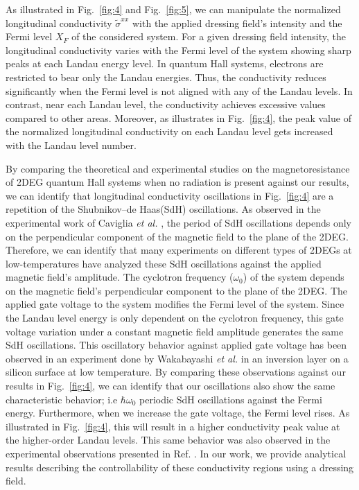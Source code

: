 \documentclass[
 reprint,
 amsmath,amssymb,
 aps,
 prb,
]{revtex4-2}
\begin{document}
As illustrated in Fig.~\ref{fig:4} and Fig.~\ref{fig:5}, we can manipulate the normalized longitudinal conductivity $\widetilde{\sigma}^{xx}$ with the applied dressing field's intensity and the Fermi level $X_F$ of the considered system.
For a given dressing field intensity, the longitudinal conductivity varies with  the Fermi level of the system showing sharp peaks at each Landau energy level.
In quantum Hall systems, electrons are restricted to bear only the Landau energies. Thus, the conductivity reduces significantly when the Fermi level is not aligned with any of the Landau levels. In contrast, near each Landau level, the conductivity achieves excessive values compared to other areas. Moreover, as illustrates in Fig.~\ref{fig:4}, the peak value of the normalized longitudinal conductivity on each Landau level gets increased with the Landau level number.

{\color{Red}
By comparing the theoretical \cite{ando72,ando74_1,ando74_2,ando74_3,ando74_4,ando82,endo09} and experimental \cite{endo09,wakabayashi78,ochiai190,mancoff96,arapov02,grbic04,caviglia10} studies on the magnetoresistance of 2DEG quantum Hall systems when no radiation is present against our results, we can identify that longitudinal conductivity oscillations in Fig.~\ref{fig:4} are a repetition of the Shubnikov–de Haas(SdH) oscillations.
As observed in the experimental work of Caviglia \textit{et al.} \cite{caviglia10}, the period of SdH oscillations depends only on the perpendicular component of the magnetic field to the plane of the 2DEG.
Therefore, we can identify that many experiments on different types of 2DEGs at low-temperatures \cite{endo09,ochiai190,mancoff96,arapov02,grbic04,caviglia10} have analyzed these SdH oscillations against the applied magnetic field's amplitude.
The cyclotron frequency ($\omega_0$) of the system depends on the magnetic field's perpendicular component to the plane of the 2DEG.
The applied gate voltage to the system modifies the Fermi level of the system.
Since the Landau level energy is only dependent on the cyclotron frequency, this gate voltage variation under a constant magnetic field amplitude generates the same SdH oscillations.
This oscillatory behavior against applied gate voltage has been observed in an  experiment done by Wakabayashi \textit{et al.} \cite{wakabayashi78} in an inversion layer on a silicon surface at low temperature.
By comparing these observations against our results in Fig.~\ref{fig:4}, we can identify that our oscillations also show the same characteristic behavior; i.e  $\hbar\omega_0$ periodic SdH oscillations against the Fermi energy.
Furthermore, when we increase the gate voltage, the Fermi level rises. As illustrated in Fig.~\ref{fig:4}, this will result in a higher conductivity peak value at the higher-order Landau levels. This same behavior was also observed in the experimental observations presented in Ref. \cite{wakabayashi78}.
In our work, we provide analytical results describing the controllability of these conductivity regions using a dressing field.}
\end{document}
